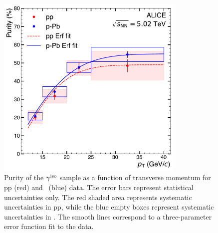 

\begin{figure}[h]
\center
\includegraphics[width=0.8\textwidth]{Data_Analysis/Purity/purity.pdf}
\caption{Purity of the $\gamma^\mathrm{iso}$ sample as a function of transverse momentum for pp (red) and \pPb~(blue) data. The error bars represent statistical uncertainties only. The red shaded area represents systematic uncertainties in pp, while the blue empty boxes represent systematic uncertainties in \pPb. The smooth lines correspond to a three-parameter error function fit to the data.}
\label{fig:purityresults}
\end{figure}

